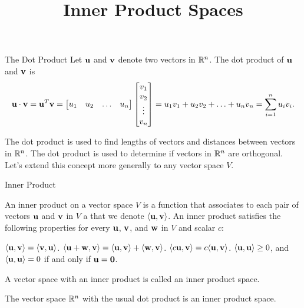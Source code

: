 \documentclass[xcolor=dvipsnames,aspectratio=169,t]{beamer}
\title{Inner Product Spaces}
\begin{document}
\maketitle

\begin{frame}{The Dot Product}
  \bbox
  Let $\mathbf{u}$ and $\mathbf{v}$ denote two vectors in $\mathbb{R}^n$. The dot product of $\mathbf{u}$ and $\mathbf{v}$ is
  \[ \mathbf{u} \cdot \mathbf{v} = \mathbf{u}^T \mathbf{v} = \begin{bmatrix} u_1 & u_2 & \ldots & u_n \end{bmatrix} \begin{bmatrix} v_1 \\ v_2 \\ \vdots \\ v_n \end{bmatrix} =  u_1v_1 + u_2 v_2 + \ldots + u_nv_n = \sum_{i=1}^n u_iv_i .\] 
  \ebox
  \medskip

  \bi
  \ii The dot product is used to find \alert{lengths} of vectors and \alert{distances} between vectors in $\mathbb{R}^n$.\smallskip
  \ii The dot product is used to determine if vectors in $\mathbb{R}^n$ are \alert{orthogonal}.\smallskip
  \ii Let's extend this concept more generally to any vector space $V$.
  \ei
\end{frame}


\begin{frame}{Inner Product}
  \begin{definition}
  An \alert{inner product} on a vector space $V$ is a function that associates to each pair of vectors $\mathbf{u}$ and $\mathbf{v}$ in $V$ a  that we denote $\langle \mathbf{u},\mathbf{v} \rangle$.
  An inner product satisfies the following properties for every $\mathbf{u}$, $\mathbf{v}$, and $\mathbf{w}$ in $V$ and scalar $c$:
  \smallskip

  \bb
  \ii $\langle \mathbf{u},\mathbf{v} \rangle = \langle \mathbf{v},\mathbf{u} \rangle$. \smallskip
  \ii $\langle \mathbf{u} + \mathbf{w},\mathbf{v} \rangle = \langle \mathbf{u},\mathbf{v} \rangle + \langle \mathbf{w},\mathbf{v} \rangle$. \smallskip
  \ii $\langle c \mathbf{u},\mathbf{v} \rangle = c \langle \mathbf{u},\mathbf{v} \rangle$. \smallskip
  \ii $\langle \mathbf{u},\mathbf{u} \rangle \geq 0$, and $ \langle \mathbf{u},\mathbf{u} \rangle =0$ if and only if $\mathbf{u} = \mathbf{0}$. \medskip
  \ee

  A vector space with an inner product is called an \alert{inner product space}.
  \end{definition}
  \medskip

  The vector space $\mathbb{R}^n$ with the usual dot product is an inner product space.
\end{frame}
\end{document}
